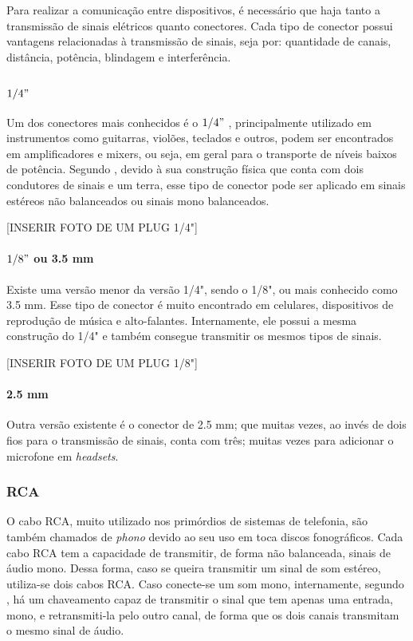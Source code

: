 Para realizar a comunicação entre dispositivos, é necessário que haja tanto a transmissão de sinais elétricos quanto conectores. Cada tipo de conector possui vantagens relacionadas à transmissão de sinais, seja por: quantidade de canais, distância, potência, blindagem e interferência.

\subsubsection{$1/4"$}
Um dos conectores mais conhecidos é o $1/4"$ , principalmente utilizado em instrumentos como guitarras, violões, teclados e outros, podem ser encontrados em amplificadores e mixers, ou seja, em geral para o transporte de níveis baixos de potência. Segundo \cite{bartlett}, devido à sua construção física que conta com dois condutores de sinais e um terra, esse tipo de conector pode ser aplicado em sinais estéreos não balanceados ou sinais mono balanceados.

[INSERIR FOTO DE UM PLUG 1/4"]

\paragraph{$1/8"$ ou 3.5 mm}

Existe uma versão menor da versão 1/4", sendo o 1/8", ou mais conhecido como 3.5 mm. Esse tipo de conector é muito encontrado em celulares, dispositivos de reprodução de música e alto-falantes. Internamente, ele possui a mesma construção do 1/4" e também consegue transmitir os mesmos tipos de sinais.

[INSERIR FOTO DE UM PLUG 1/8"]


\paragraph{2.5 mm}

Outra versão existente é o conector de 2.5 mm; que muitas vezes, ao invés de dois fios para o transmissão de sinais, conta com três; muitas vezes para adicionar o microfone em \textit{headsets}.

\subsubsection{RCA}
 O cabo RCA, muito utilizado nos primórdios de sistemas de telefonia, são também chamados de \textit{phono} devido ao seu uso em toca discos fonográficos. Cada cabo RCA tem a capacidade de transmitir, de forma não balanceada, sinais de áudio mono. Dessa forma, caso se queira transmitir um sinal de som estéreo, utiliza-se dois cabos RCA. Caso conecte-se um som mono, internamente, segundo \cite{bartlett}, há um chaveamento capaz de transmitir o sinal que tem apenas uma entrada, mono, e retransmiti-la pelo outro canal, de forma que os dois canais transmitam o mesmo sinal de áudio.

